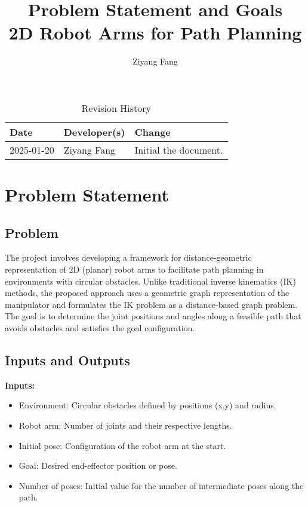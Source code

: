 \documentclass{article}
\title{Problem Statement and Goals\\2D Robot Arms for Path Planning}
\author{Ziyang Fang}
\date{}
\begin{document}
\maketitle

\begin{table}[hp]
\caption{Revision History} \label{TblRevisionHistory}
\begin{tabularx}{\textwidth}{llX}
\toprule
\textbf{Date} & \textbf{Developer(s)} & \textbf{Change}\\
\midrule
2025-01-20 & Ziyang Fang & Initial the document.\\
\bottomrule
\end{tabularx}
\end{table}

\section{Problem Statement}

\subsection{Problem}
The project involves developing a framework for distance-geometric representation of 2D (planar) robot arms to facilitate path planning in environments with circular obstacles. Unlike traditional inverse kinematics (IK) methods, the proposed approach uses a geometric graph representation of the manipulator and formulates the IK problem as a distance-based graph problem. The goal is to determine the joint positions and angles along a feasible path that avoids obstacles and satisfies the goal configuration.

\subsection{Inputs and Outputs}
\textbf{Inputs:}
\begin{itemize}
    \item Environment: Circular obstacles defined by positions (x,y) and radius.
    \item Robot arm: Number of joints and their respective lengths.
    \item Initial pose: Configuration of the robot arm at the start.
    \item Goal: Desired end-effector position or pose.
    \item Number of poses: Initial value for the number of intermediate poses along the path.
\end{itemize}
\end{document}
